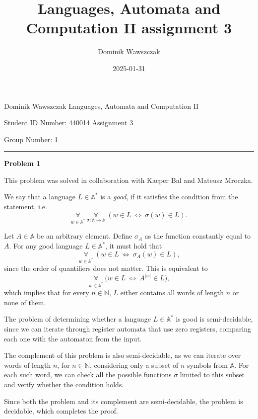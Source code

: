 \documentclass[12pt]{article}
\title{Languages, Automata and Computation II assignment 3}
\author{Dominik Wawszczak}
\date{2025-01-31}
\begin{document}
	\setlength{\parindent}{0 cm}
	
	Dominik Wawszczak \hfill Languages, Automata and Computation II
	
	Student ID Number: 440014 \hfill Assignment 3
	
	Group Number: 1
	
	\bigskip
	\hrule
	\bigskip
	
	\textbf{Problem 1}
	
	\medskip
	
	This problem was solved in collaboration with Kacper Bal and Mateusz
	Mroczka.
	
	\medskip
	
	We say that a language \(L \in \mathbb{A}^{*}\) is a \textit{good}, if it
	satisfies the condition from the statement, i.e.
	\[ \underset{w \in \mathbb{A}^{\ast}}{\forall} \
	\underset{\sigma : \mathbb{A} \to \mathbb{A}}{\forall} \ (w \in L \ \iff \
	\sigma(w) \in L) \text{.} \]
	
	\medskip
	
	Let \(A \in \mathbb{A}\) be an arbitrary element. Define \(\sigma_{A}\) as
	the function constantly equal to \(A\). For any good language \(L \in
	\mathbb{A}^{\ast}\), it must hold that
	\[ \underset{w \in \mathbb{A}^{\ast}}{\forall} \ (w \in L \ \iff \
	\sigma_{A}(w) \in L) \text{,} \]
	since the order of quantifiers does not matter. This is equivalent to
	\[ \underset{w \in \mathbb{A}^{\ast}}{\forall} \ \big( w \in L \ \iff \
	A^{|w|} \in L \big) \text{,} \]
	which implies that for every \(n \in \mathbb{N}\), \(L\) either contains all
	words of length \(n\) or none of them.
	
	\medskip
	
	The problem of determining whether a language \(L \in \mathbb{A}^{\ast}\) is
	good is semi-decidable, since we can iterate through register automata that
	use zero registers, comparing each one with the automaton from the input.
	
	\medskip
	
	The complement of this problem is also semi-decidable, as we can iterate
	over words of length \(n\), for \(n \in \mathbb{N}\), considering only a
	subset of \(n\) symbols from \(\mathbb{A}\). For each such word, we can
	check all the possible functions \(\sigma\) limited to this subset and
	verify whether the condition holds.
	
	\medskip
	
	Since both the problem and its complement are semi-decidable, the problem is
	decidable, which completes the proof.
	
\end{document}
